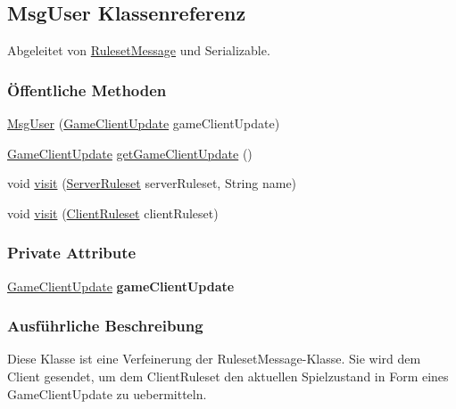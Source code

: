 \hypertarget{a00052}{\subsection{Msg\-User Klassenreferenz}
\label{a00052}
}


Abgeleitet von \hyperlink{a00053}{Ruleset\-Message} und Serializable.

\subsubsection*{Öffentliche Methoden}
\begin{DoxyCompactItemize}
\item 
\hyperlink{a00052_a568aff9987cd1b6e28b97adbb4560549}{Msg\-User} (\hyperlink{a00059}{Game\-Client\-Update} game\-Client\-Update)
\item 
\hyperlink{a00059}{Game\-Client\-Update} \hyperlink{a00052_a8a7e688a3769896385a5290159969589}{get\-Game\-Client\-Update} ()
\item 
void \hyperlink{a00052_ab45288da8f64e79408f1effd5579b5c2}{visit} (\hyperlink{a00068}{Server\-Ruleset} server\-Ruleset, String name)
\item 
void \hyperlink{a00052_acb5be722a2d1c9110d39f31c6e18f6e7}{visit} (\hyperlink{a00056}{Client\-Ruleset} client\-Ruleset)
\end{DoxyCompactItemize}
\subsubsection*{Private Attribute}
\begin{DoxyCompactItemize}
\item 
\hypertarget{a00052_a3c999ce19f77dfe2e9326cb23393d6c7}{\hyperlink{a00059}{Game\-Client\-Update} {\bfseries game\-Client\-Update}}\label{a00052_a3c999ce19f77dfe2e9326cb23393d6c7}

\end{DoxyCompactItemize}


\subsubsection{Ausführliche Beschreibung}
Diese Klasse ist eine Verfeinerung der Ruleset\-Message-\/\-Klasse. Sie wird dem Client gesendet, um dem Client\-Ruleset den aktuellen Spielzustand in Form eines Game\-Client\-Update zu uebermitteln. 


